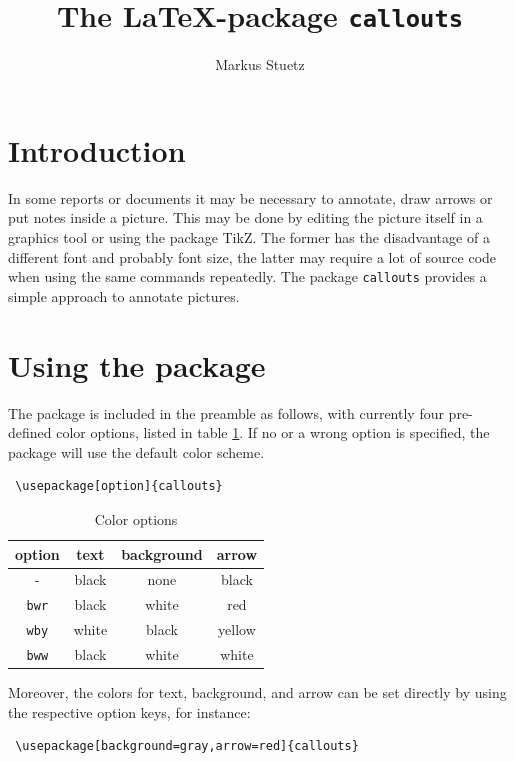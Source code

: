 \documentclass[a4paper,11pt]{article}
\title{The \LaTeX-package \texttt{callouts}}
\author{Markus Stuetz}
\begin{document}
\maketitle

\section{Introduction}
In some reports or documents it may be necessary to annotate, draw arrows or put notes inside a picture. This may be done by editing the picture itself in a graphics tool or using the package TikZ. The former has the disadvantage of a different font and probably font size, the latter may require a lot of source code when using the same commands repeatedly. The package \texttt{callouts} provides a simple approach to annotate pictures.

\section{Using the package}

The package is included in the preamble as follows, with currently four pre-defined color options, listed in table \ref{tab:colors}. If no or a wrong option is specified, the package will use the default color scheme.

\begin{lstlisting}
 \usepackage[option]{callouts}
\end{lstlisting}

\begin{table}[htb]
 \centering
 \caption{Color options}\label{tab:colors}
 \begin{tabular}{cccc}
 \toprule
  option & text & background & arrow \\
  \midrule
  -& black & none & black \\
  \texttt{bwr}	& black & white & red \\
  \texttt{wby}	& white & black & yellow \\
  \texttt{bww}	& black & white & white\\
  \bottomrule
 \end{tabular}
\end{table}

Moreover, the colors for text, background, and arrow can be set directly by using the respective option keys, for instance:

\begin{lstlisting}
 \usepackage[background=gray,arrow=red]{callouts}
\end{lstlisting}
\end{document}
